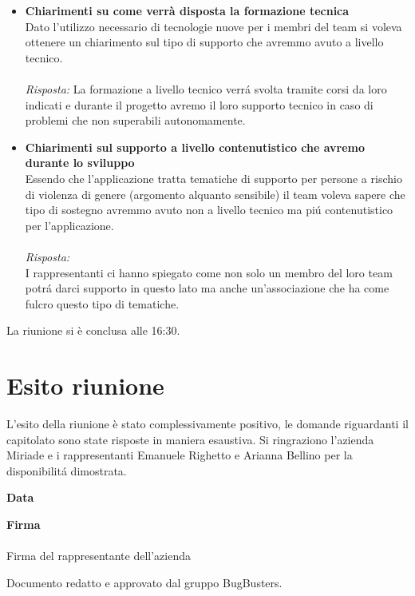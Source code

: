 \documentclass[a4paper,12pt]{article}
\begin{document}
\begin{itemize}
    \item \textbf{Chiarimenti su come verrà disposta la formazione tecnica}\\
    \noindent
    Dato l'utilizzo necessario di tecnologie nuove per i membri del team si voleva ottenere un chiarimento sul tipo di supporto che avremmo avuto a livello tecnico. \\ \\
    \textit{Risposta:} 
    La formazione a livello tecnico verrá svolta tramite corsi da loro indicati e durante il progetto avremo il loro supporto tecnico in caso di problemi che non superabili autonomamente.
    \vspace{1em}

    \item \textbf{Chiarimenti sul supporto a livello contenutistico che avremo durante lo sviluppo}\\
    \noindent
    Essendo che l'applicazione tratta tematiche di supporto per persone a rischio di violenza di genere (argomento alquanto sensibile) il team voleva sapere che tipo di sostegno avremmo avuto non a livello tecnico ma piú contenutistico per l'applicazione. \\ \\
    \textit{Risposta:} \\
    I rappresentanti ci hanno spiegato come non solo un membro del loro team potrá darci supporto in questo lato ma anche un'associazione che ha come fulcro questo tipo di tematiche.
    \vspace{1em}
\end{itemize}

La riunione si è conclusa alle 16:30.


\section{Esito riunione}
    L'esito della riunione è stato complessivamente positivo, le domande riguardanti il capitolato sono state risposte in maniera esaustiva. Si ringraziono l'azienda Miriade e i rappresentanti Emanuele Righetto e Arianna Bellino per la disponibilitá dimostrata.
    

\vspace{1.5cm}
\noindent\textbf{\Large Data}\\[0.4cm]
\underline{\hspace{4cm}}

\vspace{1.5cm}
\noindent\textbf{\Large Firma}\\[0.8cm]
\underline{\hspace{6cm}} \\[0.2cm]
{\small Firma del rappresentante dell'azienda}

\vfill
\begin{center}
    {\small\color{darkgray} Documento redatto e approvato dal gruppo BugBusters.}
\end{center}
\end{document}
